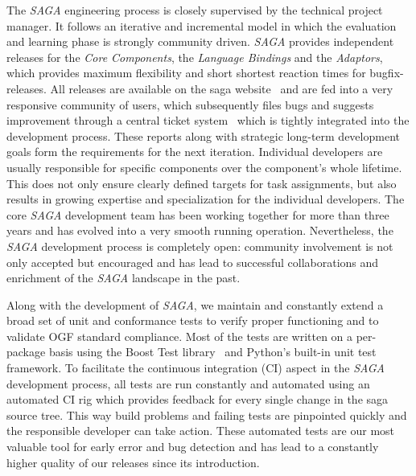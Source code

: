 \documentclass[a4paper,10pt]{article}
\newcommand{\I}[1]{\textit{#1}}
\newcommand{\sagaimpl}{\textit{SAGA}\xspace}
\newcommand{\impl}{\sagaimpl}
\begin{document}
The \impl engineering process is closely supervised by the technical
project manager. It follows an iterative and incremental model in
which the evaluation and learning phase is strongly community
driven. \impl provides independent releases for the \I{Core
  Components}, the \I{Language Bindings} and the \I{Adaptors}, which
provides maximum flexibility and short shortest reaction times for
bugfix-releases. All releases are available on the saga
website~\cite{saga_downloads_web} and are fed into a very responsive
community of users, which subsequently files bugs and suggests
improvement through a central ticket
system~\cite{saga_bugtracking_web} which is tightly integrated into
the development process. These reports along with strategic long-term
development goals form the requirements for the next
iteration. Individual developers are usually responsible for specific
components over the component's whole lifetime. This does not only
ensure clearly defined targets for task assignments, but also results
in growing expertise and specialization for the individual
developers. The core \impl development team has been working together
for more than three years and has evolved into a very smooth running
operation. Nevertheless, the \impl development process is completely
open: community involvement is not only accepted but encouraged and
has lead to successful collaborations and enrichment of the \impl
landscape in the past.

Along with the development of \impl, we maintain and constantly extend a broad set of unit and conformance tests to verify proper functioning and to validate OGF standard compliance. Most of the tests are written on a per-package basis using the Boost Test library~\cite{boost_test_web} and Python's built-in unit test framework. To facilitate the continuous integration (CI) aspect in the \impl development process, all tests are run constantly and automated using an automated CI rig\cite{buildbot_web} which provides feedback for every single change in the saga source tree. This way build problems and failing tests are pinpointed quickly and the responsible developer can take action. These automated tests are  our most valuable tool for early error and bug detection and has lead to a constantly higher quality of our releases since its introduction.
 
\end{document}
